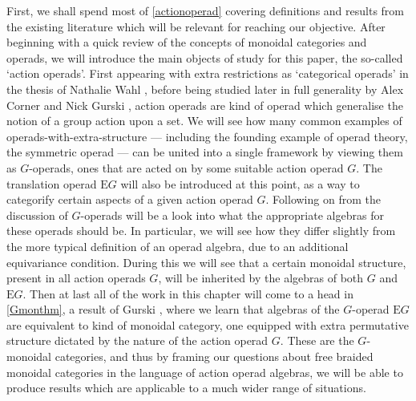 First, we shall spend most of \cref{actionoperad} covering definitions and results from the existing literature which will be relevant for reaching our objective. After beginning with a quick review of the concepts of monoidal categories and operads, we will introduce the main objects of study for this paper, the so-called `action operads'. First appearing with extra restrictions as `categorical operads' in the thesis of Nathalie Wahl \cite{ribbon1}, before being studied later in full generality by Alex Corner and Nick Gurski \cite{ogge}, action operads are kind of operad which generalise the notion of a group action upon a set. We will see how many common examples of operads-with-extra-structure --- including the founding example of operad theory, the symmetric operad \cite{gils} --- can be united into a single framework by viewing them as $G$-operads, ones that are acted on by some suitable action operad $G$. The translation operad $\mathrm{E}G$ will also be introduced at this point, as a way to categorify certain aspects of a given action operad $G$. Following on from the discussion of $G$-operads will be a look into what the appropriate algebras for these operads should be. In particular, we will see how they differ slightly from the more typical definition of an operad algebra, due to an additional equivariance condition. During this we will see that a certain monoidal structure, present in all action operads $G$, will be inherited by the algebras of both $G$ and $\mathrm{E}G$. Then at last all of the work in this chapter will come to a head in \cref{Gmonthm}, a result of Gurski \cite{operadborel}, where we learn that algebras of the $G$-operad $\mathrm{E}G$ are equivalent to kind of monoidal category, one equipped with extra permutative structure dictated by the nature of the action operad $G$. These are the $G$-monoidal categories, and thus by framing our questions about free braided monoidal categories in the language of action operad algebras, we will be able to produce results which are applicable to a much wider range of situations. 

